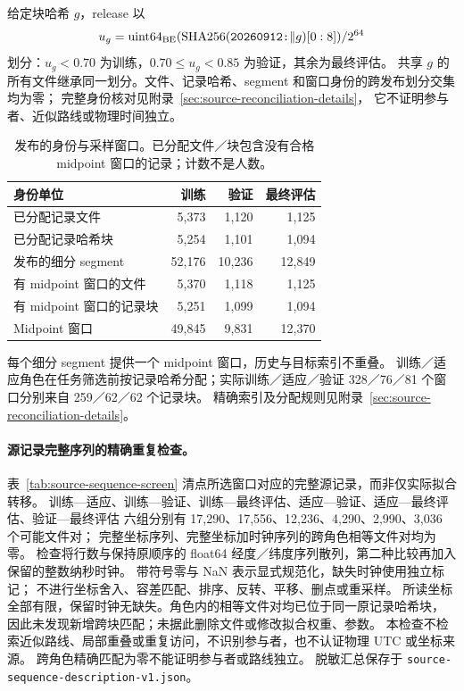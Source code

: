 \documentclass[UTF8,11pt]{ctexart}
\begin{document}
给定块哈希 \(g\)，release 以
\[
u_g=\operatorname{uint64}_{\rm BE}
(\operatorname{SHA256}(\texttt{20260912:}\Vert g)[0:8])/2^{64}
\]
划分：\(u_g<0.70\) 为训练，\(0.70\leq u_g<0.85\) 为验证，其余为最终评估。
共享 \(g\) 的所有文件继承同一划分。文件、记录哈希、segment 和窗口身份的跨发布划分交集均为零；
完整身份核对见附录~\ref{sec:source-reconciliation-details}，
它不证明参与者、近似路线或物理时间独立。

\begin{table}[htbp]
\centering\small
\caption{发布的身份与采样窗口。已分配文件／块包含没有合格 midpoint 窗口的记录；计数不是人数。}
\label{tab:release-partition-identities}
\begin{tabular}{@{}p{.45\linewidth}rrr@{}}
\toprule
身份单位 & 训练 & 验证 & 最终评估\\
\midrule
已分配记录文件 & 5,373 & 1,120 & 1,125\\
已分配记录哈希块 & 5,254 & 1,101 & 1,094\\
发布的细分 segment & 52,176 & 10,236 & 12,849\\
有 midpoint 窗口的文件 & 5,370 & 1,118 & 1,125\\
有 midpoint 窗口的记录块 & 5,251 & 1,099 & 1,094\\
Midpoint 窗口 & 49,845 & 9,831 & 12,370\\
\bottomrule
\end{tabular}
\end{table}

每个细分 segment 提供一个 midpoint 窗口，历史与目标索引不重叠。
训练／适应角色在任务筛选前按记录哈希分配；实际训练／适应／验证
328／76／81 个窗口分别来自 259／62／62 个记录块。
精确索引及分配规则见附录~\ref{sec:source-reconciliation-details}。

\paragraph{源记录完整序列的精确重复检查。}\label{sec:source-sequence-screen}
表~\ref{tab:source-sequence-screen} 清点所选窗口对应的完整源记录，而非仅实际拟合转移。
训练—适应、训练—验证、训练—最终评估、适应—验证、适应—最终评估、验证—最终评估
六组分别有 17,290、17,556、12,236、4,290、2,990、3,036 个可能文件对；
完整坐标序列、完整坐标加时钟序列的跨角色相等文件对均为零。
检查将行数与保持原顺序的 float64 经度／纬度序列散列，第二种比较再加入保留的整数纳秒时钟。
带符号零与 NaN 表示显式规范化，缺失时钟使用独立标记；
不进行坐标舍入、容差匹配、排序、反转、平移、删点或重采样。
所读坐标全部有限，保留时钟无缺失。角色内的相等文件对均已位于同一原记录哈希块，
因此未发现新增跨块匹配；未据此删除文件或修改拟合权重、参数。
本检查不检索近似路线、局部重叠或重复访问，不识别参与者，也不认证物理 UTC 或坐标来源。
跨角色精确匹配为零不能证明参与者或路线独立。
脱敏汇总保存于 \texttt{source-sequence-description-v1.json}。
\end{document}

